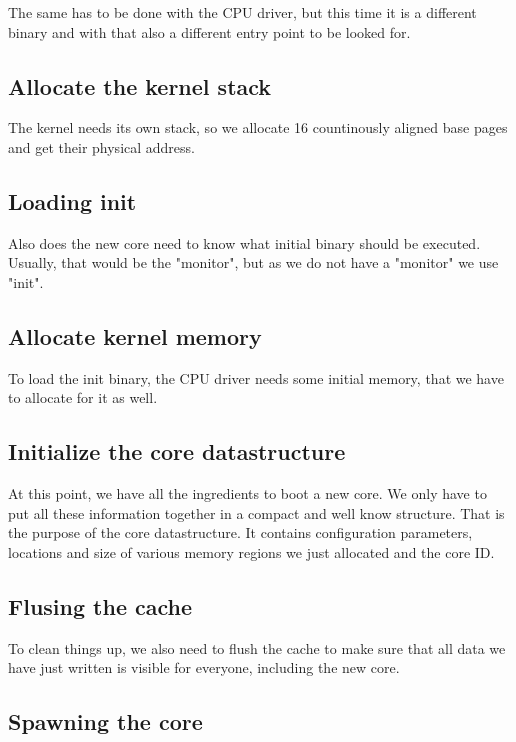 The same has to be done with the CPU driver, but this time it is a different
binary and with that also a different entry point to be looked for.

\subsection{Allocate the kernel stack}

The kernel needs its own stack, so we allocate 16 countinously aligned base
pages and get their physical address.

\subsection{Loading init}

Also does the new core need to know what initial binary should be executed.
Usually, that would be the "monitor", but as we do not have a "monitor" we use
"init".

\subsection{Allocate kernel memory}

To load the init binary, the CPU driver needs some initial memory, that we have
to allocate for it as well.

\subsection{Initialize the core datastructure}

At this point, we have all the ingredients to boot a new core. We only have to
put all these information together in a compact and well know structure. That is
the purpose of the core datastructure. It contains configuration parameters,
locations and size of various memory regions we just allocated and the core ID.

\subsection{Flusing the cache}

To clean things up, we also need to flush the cache to make sure that all data
we have just written is visible for everyone, including the new core.

\subsection{Spawning the core}

